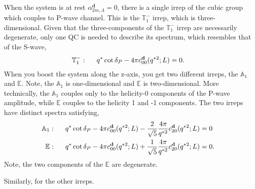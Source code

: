 When the system is at rest $\alpha_{2m,\Lambda}^\mathbf{d}=0$, there is a single irrep of the cubic group which couples to P-wave channel. This is the $\mathbb{T}_1^-$ irrep, which is three-dimensional. Given that the three-components of the $\mathbb{T}_1^-$ irrep are necessarily degenerate, only one QC is needed to describe its spectrum, which resembles that of the S-wave,
\begin{align}
\mathbb{T}_1^-:\hspace{.5cm} q^{*}\cot\delta_{P}-
{4\pi}
 c^\mathbf{d}_{00}(q^{*2};L)=0.
\end{align}
When you boost the system along the z-axis, you get two different irreps, the $\mathbb{A}_1$ and $\mathbb{E}$. Note, the $\mathbb{A}_1$ is one-dimensional and $\mathbb{E}$ is two-dimensional. More technically, the $\mathbb{A}_1$ couples only to the helicity-0 components of the P-wave amplitude, while $\mathbb{E}$ couples to the helicity 1 and -1 components. The two irreps have  distinct spectra satisfying,
\begin{align}
\mathbb{A}_1&:\hspace{.5cm}q^{*}\cot\delta_{P}-
{4\pi}
 c^\mathbf{d}_{00}(q^{*2};L)
 -
\frac{2}{\sqrt{5}}\frac{4\pi}{q^{*2}}
 c^\mathbf{d}_{20}(q^{*2};L)=0\\
\mathbb{E}&:\hspace{.5cm}q^{*}\cot\delta_{P}-
{4\pi}
 c^\mathbf{d}_{00}(q^{*2};L)
 +
\frac{1}{\sqrt{5}}\frac{4\pi}{q^{*2}}
 c^\mathbf{d}_{20}(q^{*2};L)=0. 
\end{align}
Note, the two components of the $\mathbb{E}$ are degenerate. 

Similarly, for the other irreps. 